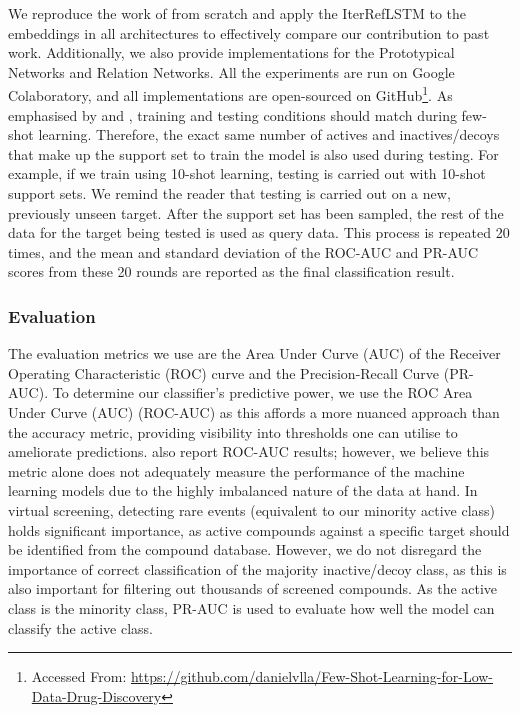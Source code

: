 \documentclass[journal=jcisd8,manuscript=article]{achemso} %
\begin{document}
We reproduce the work of \citet{altae2017low} from scratch and apply the IterRefLSTM to the embeddings in all architectures to effectively compare our contribution to past work. Additionally, we also provide implementations for the Prototypical Networks and Relation Networks. All the experiments are run on Google Colaboratory, and all implementations are open-sourced on GitHub\footnote{Accessed From: \url{https://github.com/danielvlla/Few-Shot-Learning-for-Low-Data-Drug-Discovery}}. As emphasised by \citet{vinyals2016matching} and \citet{snell2017prototypical}, training and testing conditions should match during few-shot learning. Therefore, the exact same number of actives and inactives/decoys that make up the support set to train the model is also used during testing. For example, if we train using 10-shot learning, testing is carried out with 10-shot support sets. We remind the reader that testing is carried out on a new, previously unseen target. After the support set has been sampled, the rest of the data for the target being tested is used as query data. This process is repeated 20 times, and the mean and standard deviation of the ROC-AUC and PR-AUC scores from these 20 rounds are reported as the final classification result.

\subsubsection{Evaluation}

The evaluation metrics we use are the Area Under Curve (AUC) of the Receiver Operating Characteristic (ROC) curve and the Precision-Recall Curve (PR-AUC). To determine our classifier's predictive power, we use the ROC Area Under Curve (AUC) (ROC-AUC) as this affords a more nuanced approach than the accuracy metric, providing visibility into thresholds one can utilise to ameliorate predictions. \citet{altae2017low} also report ROC-AUC results; however, we believe this metric alone does not adequately measure the performance of the machine learning models due to the highly imbalanced nature of the data at hand. In virtual screening, detecting rare events (equivalent to our minority active class) holds significant importance, as active compounds against a specific target should be identified from the compound database. However, we do not disregard the importance of correct classification of the majority inactive/decoy class, as this is also important for filtering out thousands of screened compounds. As the active class is the minority class, PR-AUC is used to evaluate how well the model can classify the active class.
\end{document}
